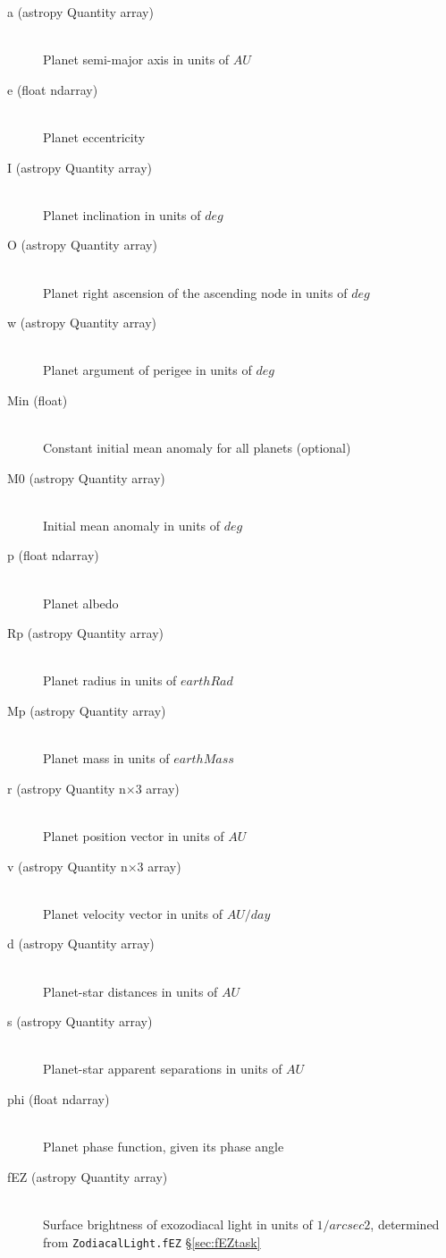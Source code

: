 \documentclass[cleanfoot]{asme2ej}
\begin{document}
\begin{itemize}
\begin{description}
    \item[a (astropy Quantity array)] \hfill \\ Planet semi-major axis in units of $ AU $
    \item[e (float ndarray)] \hfill \\ Planet eccentricity
    \item[I (astropy Quantity array)] \hfill \\ Planet inclination in units of $ deg $
    \item[O (astropy Quantity array)] \hfill \\ Planet right ascension of the ascending node in units of $ deg $
    \item[w (astropy Quantity array)] \hfill \\ Planet argument of perigee in units of $ deg $
    \item[Min (float)] \hfill \\ Constant initial mean anomaly for all planets (optional)
    \item[M0 (astropy Quantity array)] \hfill \\ Initial mean anomaly in units of $ deg $
    \item[p (float ndarray)] \hfill \\ Planet albedo
    \item[Rp (astropy Quantity array)] \hfill \\ Planet radius in units of $earthRad$
    \item[Mp (astropy Quantity array)] \hfill \\ Planet mass in units of $earthMass$
    \item[r (astropy Quantity n$\times$3 array)] \hfill \\ Planet position vector in units of $ AU $
    \item[v (astropy Quantity n$\times$3 array)] \hfill \\ Planet velocity vector in units of $ AU/day $
    \item[d (astropy Quantity array)] \hfill \\ Planet-star distances in units of $ AU $
    \item[s (astropy Quantity array)] \hfill \\ Planet-star apparent separations in units of $ AU $
    \item[phi (float ndarray)] \hfill \\ Planet phase function, given its phase angle
    \item[fEZ (astropy Quantity array)] \hfill \\ Surface brightness of exozodiacal light in units of $ 1/arcsec2 $, determined from \verb+ZodiacalLight.fEZ+ \S\ref{sec:fEZtask}

\end{description}
\end{itemize}
\end{document}
